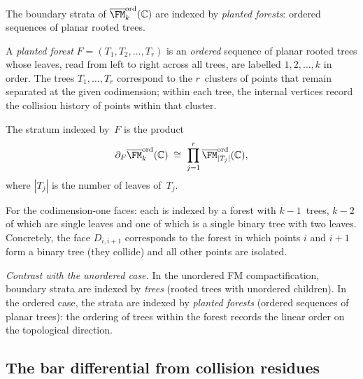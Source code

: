 \begin{construction}
\label{constr:planted-forests}
The boundary strata of $\overline{\FM}_k^{\mathrm{ord}}(\mathbb C)$
are indexed by \emph{planted forests}: ordered sequences of
planar rooted trees.

A \emph{planted forest} $F=(T_1,T_2,\dots,T_r)$ is an
\emph{ordered} sequence of planar rooted trees whose leaves,
read from left to right across all trees, are labelled
$1,2,\dots,k$ in order. The trees $T_1,\dots,T_r$ correspond
to the $r$~clusters of points that remain separated at the
given codimension; within each tree, the internal vertices
record the collision history of points within that cluster.

The stratum indexed by~$F$ is the product
\[
\partial_F\overline{\FM}_k^{\mathrm{ord}}(\mathbb C)
\;\cong\;
\prod_{j=1}^r
\overline{\FM}_{|T_j|}^{\mathrm{ord}}(\mathbb C),
\]
where $|T_j|$ is the number of leaves of~$T_j$.

For the codimension-one faces: each is indexed by a forest
with $k{-}1$~trees, $k{-}2$ of which are single leaves and one
of which is a single binary tree with two leaves.
Concretely, the face $D_{i,i+1}$ corresponds to the forest in
which points $i$ and $i{+}1$ form a binary tree (they collide)
and all other points are isolated.

\emph{Contrast with the unordered case.}
In the unordered FM compactification, boundary strata are
indexed by \emph{trees} (rooted trees with unordered children).
In the ordered case, the strata are indexed by
\emph{planted forests} (ordered sequences of planar trees):
the ordering of trees within the forest records the linear
order on the topological direction.
\end{construction}

\subsection{The bar differential from collision residues}
\label{subsec:bar-diff-collision}

